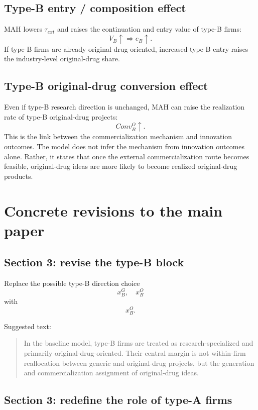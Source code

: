 \documentclass[12pt]{article}
\begin{document}
\subsection{Type-B entry / composition effect}

MAH lowers $\tau_{ext}$ and raises the continuation and entry value of type-B firms:
\[
V_B\uparrow
\Rightarrow
e_B\uparrow.
\]
If type-B firms are already original-drug-oriented, increased type-B entry raises the industry-level original-drug share.

\subsection{Type-B original-drug conversion effect}

Even if type-B research direction is unchanged, MAH can raise the realization rate of type-B original-drug projects:
\[
Conv_B^O\uparrow.
\]
This is the link between the commercialization mechanism and innovation outcomes. The model does not infer the mechanism from innovation outcomes alone. Rather, it states that once the external commercialization route becomes feasible, original-drug ideas are more likely to become realized original-drug products.

\section{Concrete revisions to the main paper}

\subsection{Section 3: revise the type-B block}

Replace the possible type-B direction choice
\[
x_B^G,\quad x_B^O
\]
with
\[
x_B^O.
\]

Suggested text:
\begin{quote}
In the baseline model, type-B firms are treated as research-specialized and primarily original-drug-oriented. Their central margin is not within-firm reallocation between generic and original-drug projects, but the generation and commercialization assignment of original-drug ideas.
\end{quote}

\subsection{Section 3: redefine the role of type-A firms}
\end{document}
